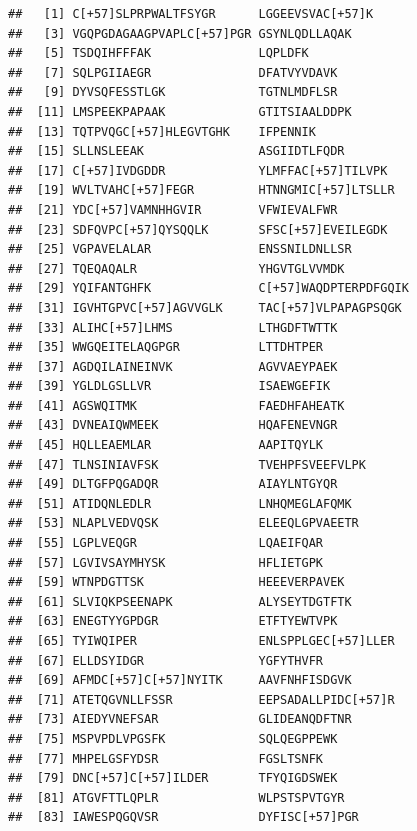 \documentclass[]{book}
\begin{document}
\begin{verbatim}
##   [1] C[+57]SLPRPWALTFSYGR      LGGEEVSVAC[+57]K         
##   [3] VGQPGDAGAAGPVAPLC[+57]PGR GSYNLQDLLAQAK            
##   [5] TSDQIHFFFAK               LQPLDFK                  
##   [7] SQLPGIIAEGR               DFATVYVDAVK              
##   [9] DYVSQFESSTLGK             TGTNLMDFLSR              
##  [11] LMSPEEKPAPAAK             GTITSIAALDDPK            
##  [13] TQTPVQGC[+57]HLEGVTGHK    IFPENNIK                 
##  [15] SLLNSLEEAK                ASGIIDTLFQDR             
##  [17] C[+57]IVDGDDR             YLMFFAC[+57]TILVPK       
##  [19] WVLTVAHC[+57]FEGR         HTNNGMIC[+57]LTSLLR      
##  [21] YDC[+57]VAMNHHGVIR        VFWIEVALFWR              
##  [23] SDFQVPC[+57]QYSQQLK       SFSC[+57]EVEILEGDK       
##  [25] VGPAVELALAR               ENSSNILDNLLSR            
##  [27] TQEQAQALR                 YHGVTGLVVMDK             
##  [29] YQIFANTGHFK               C[+57]WAQDPTERPDFGQIK    
##  [31] IGVHTGPVC[+57]AGVVGLK     TAC[+57]VLPAPAGPSQGK     
##  [33] ALIHC[+57]LHMS            LTHGDFTWTTK              
##  [35] WWGQEITELAQGPGR           LTTDHTPER                
##  [37] AGDQILAINEINVK            AGVVAEYPAEK              
##  [39] YGLDLGSLLVR               ISAEWGEFIK               
##  [41] AGSWQITMK                 FAEDHFAHEATK             
##  [43] DVNEAIQWMEEK              HQAFENEVNGR              
##  [45] HQLLEAEMLAR               AAPITQYLK                
##  [47] TLNSINIAVFSK              TVEHPFSVEEFVLPK          
##  [49] DLTGFPQGADQR              AIAYLNTGYQR              
##  [51] ATIDQNLEDLR               LNHQMEGLAFQMK            
##  [53] NLAPLVEDVQSK              ELEEQLGPVAEETR           
##  [55] LGPLVEQGR                 LQAEIFQAR                
##  [57] LGVIVSAYMHYSK             HFLIETGPK                
##  [59] WTNPDGTTSK                HEEEVERPAVEK             
##  [61] SLVIQKPSEENAPK            ALYSEYTDGTFTK            
##  [63] ENEGTYYGPDGR              ETFTYEWTVPK              
##  [65] TYIWQIPER                 ENLSPPLGEC[+57]LLER      
##  [67] ELLDSYIDGR                YGFYTHVFR                
##  [69] AFMDC[+57]C[+57]NYITK     AAVFNHFISDGVK            
##  [71] ATETQGVNLLFSSR            EEPSADALLPIDC[+57]R      
##  [73] AIEDYVNEFSAR              GLIDEANQDFTNR            
##  [75] MSPVPDLVPGSFK             SQLQEGPPEWK              
##  [77] MHPELGSFYDSR              FGSLTSNFK                
##  [79] DNC[+57]C[+57]ILDER       TFYQIGDSWEK              
##  [81] ATGVFTTLQPLR              WLPSTSPVTGYR             
##  [83] IAWESPQGQVSR              DYFISC[+57]PGR           

\end{verbatim}
\end{document}
